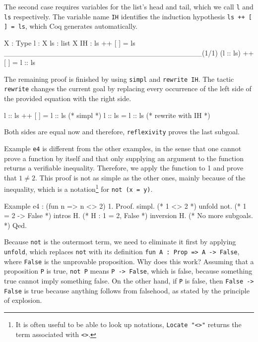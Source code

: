 \documentclass[paper = a4, fleqn, twoside]{scrreprt}
\newcommand{\coqinline}[1]{\texttt{#1}}
\begin{document}
\par
The second case requires variables for the list's head and tail, which we call \coqinline{l} and \coqinline{ls} respectively. The variable name \coqinline{IH} identifies the induction hypothesis \coqinline{ls ++ [ ] = ls}, which Coq generates automatically.
\begin{coqcode}
X : Type
l : X
ls : list X
IH : ls ++ [ ] = ls
______________________________________(1/1)
(l :: ls) ++ [ ] = l :: ls
\end{coqcode}
The remaining proof is finished by using \coqinline{simpl} and \coqinline{rewrite IH}. The tactic \coqinline{rewrite} changes the current goal by replacing every occurrence of the left side of the provided equation with the right side.
\begin{coqcode}
 l :: ls  ++ [ ] = l :: ls (* simpl *)
 l :: ls         = l :: ls (* rewrite with IH *)
\end{coqcode}
Both sides are equal now and therefore, \coqinline{reflexivity} proves the last subgoal.\\
\par \noindent
Example \coqinline{e4} is different from the other examples, in the sense that one cannot prove a function by itself and that only supplying an argument to the function returns a verifiable inequality. Therefore, we apply the function to 1 and prove that $1 \neq 2$. This proof is not as simple as the other ones, mainly because of the inequality, which is a notation\footnote{It is often useful to be able to look up notations, \coqinline{Locate "<>"} returns the term associated with \coqinline{<>}.} for \coqinline{not (x = y)}. 
\begin{coqcode}
Example e4 : (fun n => n <> 2) 1.
Proof.
  simpl.       (* 1 <> 2 *)
  unfold not.  (* 1 = 2 -> False *)
  intros H.    (* H : 1 = 2, False *)
  inversion H. (* No more subgoals. *)
Qed.
\end{coqcode}
Because \coqinline{not} is the outermost term, we need to eliminate it first by applying \coqinline{unfold}, which replaces \coqinline{not} with its definition \coqinline{fun A : Prop => A -> False}, where \coqinline{False} is the unprovable proposition. Why does this work?
Assuming that a proposition \coqinline{P} is true, \coqinline{not P} means \coqinline{P -> False}, which is false, because something true cannot imply something false. On the other hand, if \coqinline{P} is false, then \coqinline{False -> False} is true because anything follows from falsehood, as stated by the principle of explosion.
\par
\end{document}
